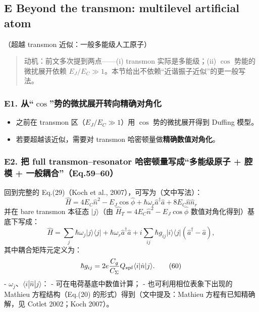 \documentclass[12pt,a4paper,oneside]{ctexbook}
\providecommand{\tightlist}{%
  \setlength{\itemsep}{0pt}\setlength{\parskip}{0pt}}
\begin{document}
\subsection{E Beyond the transmon:
multilevel artificial
atom}
（超越 transmon 近似：一般多能级人工原子）

\begin{quote}
动机：前文多次提到两点------(i) transmon 实际是多能级；(ii) \(\cos\)
势能的微扰展开依赖
\(E_J/E_C\gg 1\)。本节给出不依赖``近谐振子近似''的更一般写法。
\end{quote}

\subsubsection{\texorpdfstring{\textbf{E1.
从``\(\cos\)''势的微扰展开转向精确对角化}}{E1. 从``\textbackslash{}cos''势的微扰展开转向精确对角化}}\label{e1.-ux4ececosux52bfux7684ux5faeux6270ux5c55ux5f00ux8f6cux5411ux7cbeux786eux5bf9ux89d2ux5316}

\begin{itemize}
\tightlist
\item
  之前在 transmon 区（\(E_J/E_C\gg 1\)）用 \(\cos\) 势的微扰展开得到
  Duffing 模型。
\item
  若要超越该近似，需要对 transmon 哈密顿量做\textbf{精确数值对角化}。
\end{itemize}

\subsubsection{\texorpdfstring{\textbf{E2. 把 full transmon--resonator
哈密顿量写成``多能级原子 + 腔模 +
一般耦合''（Eq.59--60）}}{E2. 把 full transmon--resonator 哈密顿量写成``多能级原子 + 腔模 + 一般耦合''（Eq.59--60）}}\label{e2.-ux628a-full-transmonresonator-ux54c8ux5bc6ux987fux91cfux5199ux6210ux591aux80fdux7ea7ux539fux5b50-ux8154ux6a21-ux4e00ux822cux8026ux5408eq.5960}

回到完整的 Eq.(29)（Koch et al., 2007），可写为（文中写法）： \[
\hat H
=4E_C\hat n^2-E_J\cos\hat\phi+\hbar\omega_r\hat a^\dagger\hat a+8E_C\hat n\hat n_r
\] 并在 bare transmon 本征态 \(|j\rangle\)（由
\(\hat H_T=4E_C\hat n^2-E_J\cos\hat\phi\) 数值对角化得到）基底下写成：
\[
\hat H
=\sum_j \hbar\omega_j |j\rangle\langle j|
+\hbar\omega_r\hat a^\dagger\hat a
+i\sum_{ij}\hbar g_{ij}|i\rangle\langle j|(\hat a^\dagger-\hat a),
\tag{59}
\] 其中耦合矩阵元定义为： \[
\hbar g_{ij}=2e\frac{C_g}{C_\Sigma}Q_{\rm zpf}\langle i|\hat n|j\rangle.
\tag{60}
\] - \(\omega_j\)、\(\langle i|\hat n|j\rangle\)： -
可在电荷基底中数值计算； - 也可利用相位表象下出现的 Mathieu
方程结构（Eq.(20) 的形式）得到（文中提及：Mathieu 方程有已知精确解，见
Cotlet 2002；Koch 2007）。
\end{document}
